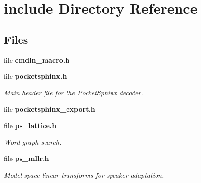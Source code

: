\section{include Directory Reference}
\label{dir_d44c64559bbebec7f509842c48db8b23}
\subsection*{Files}
\begin{DoxyCompactItemize}
\item 
file {\bfseries cmdln\-\_\-macro.\-h}
\item 
file {\bf pocketsphinx.\-h}
\begin{DoxyCompactList}\small\item\em Main header file for the Pocket\-Sphinx decoder. \end{DoxyCompactList}\item 
file {\bfseries pocketsphinx\-\_\-export.\-h}
\item 
file {\bf ps\-\_\-lattice.\-h}
\begin{DoxyCompactList}\small\item\em Word graph search. \end{DoxyCompactList}\item 
file {\bf ps\-\_\-mllr.\-h}
\begin{DoxyCompactList}\small\item\em Model-\/space linear transforms for speaker adaptation. \end{DoxyCompactList}\end{DoxyCompactItemize}
